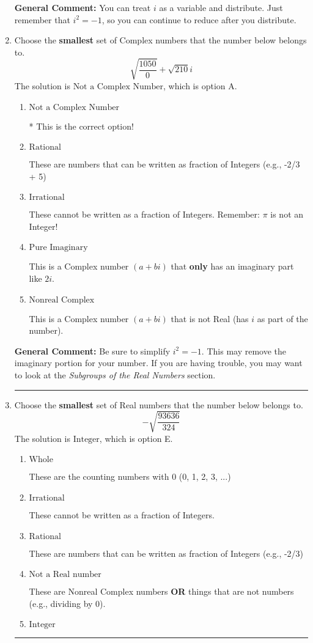 \documentclass{extbook}[14pt]
\newcommand{\litem}[1]{\item #1

\rule{\textwidth}{0.4pt}}
\begin{document}
\begin{enumerate}
{\textbf{General Comment:} You can treat $i$ as a variable and distribute. Just remember that $i^2=-1$, so you can continue to reduce after you distribute.
}
\litem{
Choose the \textbf{smallest} set of Complex numbers that the number below belongs to.
\[ \sqrt{\frac{1050}{0}}+\sqrt{210} i \]The solution is \( \text{Not a Complex Number} \), which is option A.\begin{enumerate}[label=\Alph*.]
\item \( \text{Not a Complex Number} \)

* This is the correct option!
\item \( \text{Rational} \)

These are numbers that can be written as fraction of Integers (e.g., -2/3 + 5)
\item \( \text{Irrational} \)

These cannot be written as a fraction of Integers. Remember: $\pi$ is not an Integer!
\item \( \text{Pure Imaginary} \)

This is a Complex number $(a+bi)$ that \textbf{only} has an imaginary part like $2i$.
\item \( \text{Nonreal Complex} \)

This is a Complex number $(a+bi)$ that is not Real (has $i$ as part of the number).
\end{enumerate}

\textbf{General Comment:} Be sure to simplify $i^2 = -1$. This may remove the imaginary portion for your number. If you are having trouble, you may want to look at the \textit{Subgroups of the Real Numbers} section.
}
\litem{
Choose the \textbf{smallest} set of Real numbers that the number below belongs to.
\[ -\sqrt{\frac{93636}{324}} \]The solution is \( \text{Integer} \), which is option E.\begin{enumerate}[label=\Alph*.]
\item \( \text{Whole} \)

These are the counting numbers with 0 (0, 1, 2, 3, ...)
\item \( \text{Irrational} \)

These cannot be written as a fraction of Integers.
\item \( \text{Rational} \)

These are numbers that can be written as fraction of Integers (e.g., -2/3)
\item \( \text{Not a Real number} \)

These are Nonreal Complex numbers \textbf{OR} things that are not numbers (e.g., dividing by 0).
\item \( \text{Integer} \)


\end{enumerate}}
\end{enumerate}
\end{document}
